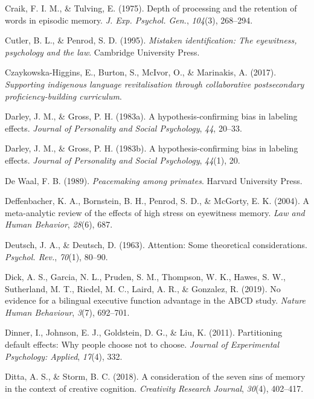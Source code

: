 \documentclass[
]{krantz}
\newlength{\cslhangindent}
\newenvironment{CSLReferences}[2] %
 {\begin{list}{}{%
  \setlength{\itemindent}{0pt}
  \setlength{\leftmargin}{0pt}
  \setlength{\parsep}{0pt}
  \ifodd #1
   \setlength{\leftmargin}{\cslhangindent}
   \setlength{\itemindent}{-1\cslhangindent}
  \fi
  \setlength{\itemsep}{#2\baselineskip}}}
 {\end{list}}
\begin{document}
\begin{CSLReferences}{1}{0}
Craik, F. I. M., \& Tulving, E. (1975). Depth of processing and the retention of words in episodic memory. \emph{J. Exp. Psychol. Gen.}, \emph{104}(3), 268--294.

Cutler, B. L., \& Penrod, S. D. (1995). \emph{Mistaken identification: The eyewitness, psychology and the law}. Cambridge University Press.

Czaykowska-Higgins, E., Burton, S., McIvor, O., \& Marinakis, A. (2017). \emph{Supporting indigenous language revitalisation through collaborative postsecondary proficiency-building curriculum}.

Darley, J. M., \& Gross, P. H. (1983a). A hypothesis-confirming bias in labeling effects. \emph{Journal of Personality and Social Psychology}, \emph{44}, 20--33.

Darley, J. M., \& Gross, P. H. (1983b). A hypothesis-confirming bias in labeling effects. \emph{Journal of Personality and Social Psychology}, \emph{44}(1), 20.

De Waal, F. B. (1989). \emph{Peacemaking among primates}. Harvard University Press.

Deffenbacher, K. A., Bornstein, B. H., Penrod, S. D., \& McGorty, E. K. (2004). A meta-analytic review of the effects of high stress on eyewitness memory. \emph{Law and Human Behavior}, \emph{28}(6), 687.

Deutsch, J. A., \& Deutsch, D. (1963). Attention: Some theoretical considerations. \emph{Psychol. Rev.}, \emph{70}(1), 80--90.

Dick, A. S., Garcia, N. L., Pruden, S. M., Thompson, W. K., Hawes, S. W., Sutherland, M. T., Riedel, M. C., Laird, A. R., \& Gonzalez, R. (2019). No evidence for a bilingual executive function advantage in the ABCD study. \emph{Nature Human Behaviour}, \emph{3}(7), 692--701.

Dinner, I., Johnson, E. J., Goldstein, D. G., \& Liu, K. (2011). Partitioning default effects: Why people choose not to choose. \emph{Journal of Experimental Psychology: Applied}, \emph{17}(4), 332.

Ditta, A. S., \& Storm, B. C. (2018). A consideration of the seven sins of memory in the context of creative cognition. \emph{Creativity Research Journal}, \emph{30}(4), 402--417.


\end{CSLReferences}
\end{document}
